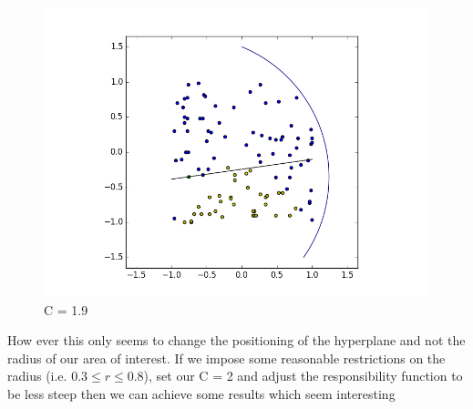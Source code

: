 \documentclass{article}
\begin{document}
\begin{figure}[H]
\begin{minipage}[b]{0.3\textwidth}
    \includegraphics[width=\textwidth]{BoundaryHunter-Attempt3-04.png}
    \caption{C = 1.9}
  \end{minipage}
\end{figure}

How ever this only seems to change the positioning of the hyperplane and not the radius of our area of interest. If we impose some reasonable restrictions on the radius (i.e. $0.3 \leq r \leq 0.8$), set our C = 2 and adjust the responsibility function to be less steep then we can achieve some results which seem interesting
\end{document}
